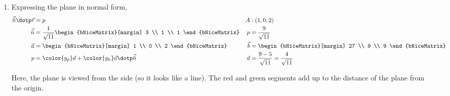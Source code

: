 \begin{enumerate}
      \item Expressing the plane in normal form,
            \begin{align}
                  \vec{\hat{n}} \dotp \vec{r} & = p                           &
                  A                           & : (1, 0, 2)                     \\
                  \vec{\hat{n}}               & = \frac{1}{\sqrt{11}}
                  \begin{bNiceMatrix}[margin]
                        3 \\ 1 \\ 1
                  \end{bNiceMatrix} &
                  p                           & = \frac{9}{\sqrt{11}}           \\
                  \vec{a}                     & = \begin{bNiceMatrix}[margin]
                                                        1 \\ 0 \\ 2
                                                  \end{bNiceMatrix} &
                  \vec{b}                     & = \begin{bNiceMatrix}[margin]
                                                        27 \\ 9 \\ 9
                                                  \end{bNiceMatrix}    \\
                  p                           & = {\color{y_p}d}
                  + {\color{y_h} \vec{a}
                  \dotp \vec{\hat{n}}}        &
                  d                           & = \frac{9 - 5}{\sqrt{11}}
                  = \frac{4}{\sqrt{11}}
            \end{align}

            \begin{figure}[H]
                  \centering
            \end{figure}
            Here, the plane is viewed from the side (so it looks like a line). The red
            and green segments add up to the distance of the plane from the origin.


\end{enumerate}

